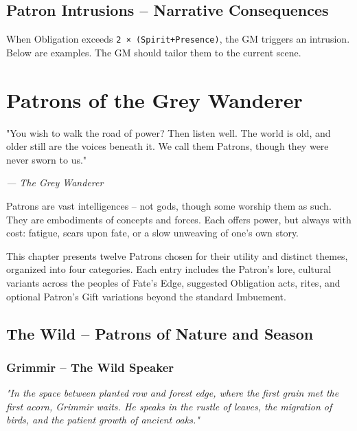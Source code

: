 \documentclass[10pt,a5paper]{book}
\begin{document}
\section{Patron Intrusions -- Narrative Consequences}
When Obligation exceeds \texttt{2 × (Spirit+Presence)}, the GM triggers an intrusion. Below are examples. The GM should tailor them to the current scene.

\clearpage



\chapter{Patrons of the Grey Wanderer}

\epigraph{"You wish to walk the road of power? Then listen well. The world is old, and older still are the voices beneath it. We call them Patrons, though they were never sworn to us."}{\textit{--- The Grey Wanderer}}

Patrons are vast intelligences -- not gods, though some worship them as such. They are embodiments of concepts and forces. Each offers power, but always with cost: fatigue, scars upon fate, or a slow unweaving of one's own story.

This chapter presents twelve Patrons chosen for their utility and distinct themes, organized into four categories. Each entry includes the Patron's lore, cultural variants across the peoples of Fate's Edge, suggested Obligation acts, rites, and optional Patron's Gift variations beyond the standard Imbuement.

\section{The Wild -- Patrons of Nature and Season}

\subsection{Grimmir -- The Wild Speaker}
\label{patron:grimmir}

\textit{"In the space between planted row and forest edge, where the first grain met the first acorn, Grimmir waits. He speaks in the rustle of leaves, the migration of birds, and the patient growth of ancient oaks."}
\end{document}
